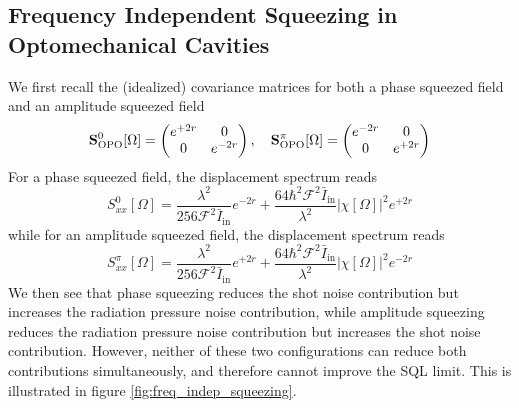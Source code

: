 \subsection{Frequency Independent Squeezing in Optomechanical Cavities}
We first recall the (idealized) covariance matrices for both a phase squeezed field and an amplitude squeezed field 
\begin{equation*}
  \mathbf{S}^{0}_{\rm OPO}[\Omega] = 
  \begin{pmatrix}
    e^{+2r} & 0\\
    0 & e^{-2r}
  \end{pmatrix}, \quad
  \mathbf{S}^{\pi}_{\rm OPO}[\Omega] = 
  \begin{pmatrix}
    e^{-2r} & 0\\
    0 & e^{+2r}
  \end{pmatrix}
\end{equation*}
For a phase squeezed field, the displacement spectrum reads
\begin{equation}
  S_{xx}^{0}[\Omega] = \dfrac{\lambda^2}{256 \mathcal{F}^2 \bar{I}_\mathrm{in}}  e^{-2r} + \dfrac{64 \hbar^2 \mathcal{F}^2 \bar{I}_\mathrm{in}}{\lambda^2}|\chi[\Omega]|^2 e^{+2r}
\end{equation}
while for an amplitude squeezed field, the displacement spectrum reads
\begin{equation}
  S_{xx}^{\pi}[\Omega] = \dfrac{\lambda^2}{256 \mathcal{F}^2 \bar{I}_\mathrm{in}}  e^{+2r} + \dfrac{64 \hbar^2 \mathcal{F}^2 \bar{I}_\mathrm{in}}{\lambda^2}|\chi[\Omega]|^2 e^{-2r}
\end{equation}
We then see that phase squeezing reduces the shot noise contribution but increases the radiation pressure noise contribution, while amplitude squeezing reduces the radiation pressure noise contribution but increases the shot noise contribution. However, neither of these two configurations can reduce both contributions simultaneously, and therefore cannot improve the SQL limit. This is illustrated in figure \ref{fig:freq_indep_squeezing}. 

